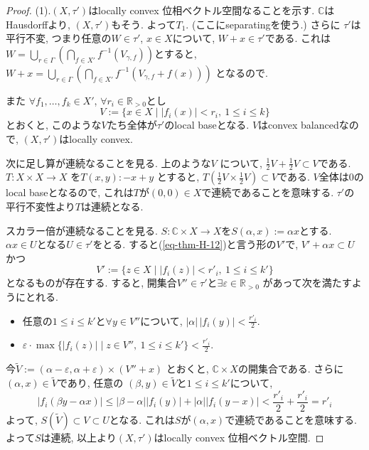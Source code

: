 \documentclass[dvipdfmx,a4paper,11pt]{article} %
\theoremstyle{definition}
\theoremstyle{remark}
\numberwithin{equation}{section}
\begin{document}
\begin{proof}
(1).\((X, \tau')\)はlocally convex 位相ベクトル空間なることを示す. 
\(\mathbb{C}\)はHausdorffより, \((X, \tau')\)もそう. よって$T_1$.
(ここにseparatingを使う.)
さらに \(\tau'\)は平行不変, 
つまり任意の\(W \in \tau'\), \(x \in X\)について, \(W + x \in \tau'\)である. 
これは\(
W = \bigcup_{r \in \Gamma} \left( \bigcap_{f \in X'} f^{-1}(V_{\gamma, f}) \right)\)とすると, 
\( W + x = \bigcup_{r \in \Gamma} \left( \bigcap_{f \in X'} f^{-1}(V_{\gamma, f} + f(x)) \right)\)
となるので. 

また
 \(\forall f_1, \dots, f_k \in X'\),  \(\forall r_i \in \mathbb{R}_{>0}\)とし
\begin{equation}
\label{eq-thm-H-12}
V := \{ x \in X \mid |f_i(x)| < r_i, \ 1 \le i \le k \}
\end{equation}
とおくと, このような$V$たち全体が$\tau'$のlocal baseとなる. 
$V$はconvex balancedなので,  \((X, \tau')\)はlocally convex.

次に足し算が連続なることを見る. 
上のような\( V\) について, 
\(\frac{1}{2}V + \frac{1}{2}V \subset V\)である. 
\(T : X \times X \to X\) を\(T(x,y):-x+y\)
とすると, $T(\frac{1}{2}V \times \frac{1}{2}V ) \subset V$である. 
$V$全体は0のlocal baseとなるので, これは$T$が$(0,0) \in X$で連続であることを意味する. 
$\tau'$の平行不変性より$T$は連続となる. 

スカラー倍が連続なることを見る. 
\(S : \mathbb{C} \times X \to X\)を\(S(\alpha, x):=\alpha x\)とする. 
 \(\alpha x \in U\)となる\(U \in \tau'\)をとる. 
 すると(\ref{eq-thm-H-12})と言う形の\(V'\)で, 
  \(V' + \alpha x \subset U\)かつ
\[
V' := \{ z \in X \mid |f_i(z)| < r'_i, \ 1 \le i \le k' \}
\]
となるものが存在する. 
すると, 開集合\(V'' \in \tau'\)と\(\exists \varepsilon \in \mathbb{R}_{>0}\) があって次を満たすようにとれる.  
\begin{itemize}
\item  任意の\(1 \le i \le k'\)と\(\forall y \in V''\)について, \(|\alpha| \, |f_i(y)| < \frac{r'_i}{2}\).
\item \(\varepsilon \cdot \max \{ |f_i(z)| \mid z \in V'', \ 1 \le i \le k' \} < \frac{r'_i}{2}\).
\end{itemize}
今\(\widetilde{V} := (\alpha - \varepsilon, \alpha + \varepsilon) \times (V'' + x) \)
とおくと, $\mathbb{C} \times X$の開集合である. 
さらに\((\alpha, x) \in \widetilde{V}\)であり, 任意の
\((\beta, y) \in \widetilde{V}\)と\(1 \le i \le k'\)について, 
\[
|f_i(\beta y - \alpha x)| \le
 |\beta - \alpha| |f_i(y)| + |\alpha| |f_i(y - x)| 
 < \frac{r'_i}{2} + \frac{r'_i}{2} = r'_i
\]
よって, $S(\widetilde{V}) \subset V \subset U$となる. 
これは$S$が$(\alpha, x)$で連続であることを意味する. よって$S$は連続,
以上より\((X, \tau')\)はlocally convex 位相ベクトル空間.


\end{proof}
\end{document}
